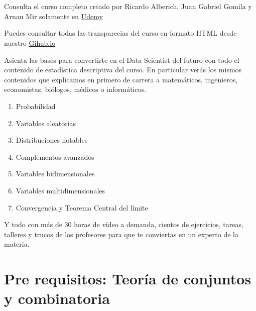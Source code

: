 \documentclass[]{book}
\providecommand{\tightlist}{%
  \setlength{\itemsep}{0pt}\setlength{\parskip}{0pt}}
\begin{document}

{
\setcounter{tocdepth}{1}
\tableofcontents
}
\newcommand{\FunCar}{\phi}
\newcommand{\FunGenMom}{m}
\newcommand{\Momk}{M}
\newcommand{\MomCenk}{MC}
\newcommand\momento{m}
\newcommand{\momentocentral}{\mu}
\newcommand{\Entropia}{H}

\hypertarget{section}{%
\chapter*{}\label{section}}

Consulta el curso completo creado por Ricardo Alberich, Juan Gabriel Gomila y Arnau Mir solamente en \href{https://www.udemy.com/course/probabilidad-y-variables-aleatorias-para-ml-con-r-y-python/?couponCode=B85F8D52148DF5AAD8F7}{Udemy}

Puedes consultar todas las transparecias del curso en formato HTML desde nuestro \href{https://github.com/joanby/probabilidad}{Gihub.io}

Asienta las bases para convertirte en el Data Scientist del futuro con todo el contenido de estadística descriptiva del curso. En particular verás los mismos contenidos que explicamos en primero de carrera a matemáticos, ingenieros, economistas, biólogos, médicos o informáticos.

\begin{enumerate}
\def\labelenumi{\arabic{enumi}.}
\tightlist
\item
  Probabilidad
\item
  Variables aleatorias
\item
  Distribuciones notables
\item
  Complementos avanzados
\item
  Variables bidimensionales
\item
  Variables multidimensionales
\item
  Convergencia y Teorema Central del límite
\end{enumerate}

Y todo con más de 30 horas de vídeo a demanda, cientos de ejercicios, tareas, talleres y trucos de los profesores para que te conviertas en un experto de la materia.

\hypertarget{pre-requisitos-teoruxeda-de-conjuntos-y-combinatoria}{%
\chapter*{Pre requisitos: Teoría de conjuntos y combinatoria}\label{pre-requisitos-teoruxeda-de-conjuntos-y-combinatoria}}
\end{document}
